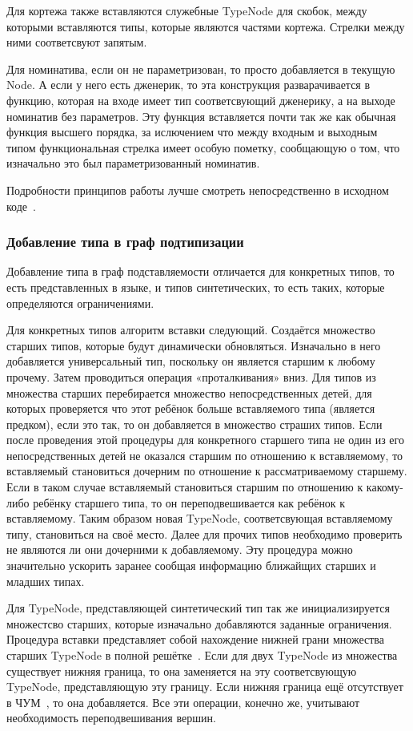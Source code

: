 \documentclass[times]{itmo-student-thesis}
\begin{document}
	Для кортежа также вставляются служебные TypeNode для скобок, между которыми вставляются типы, которые являются частями кортежа. Стрелки между ними соответсвуют запятым.
	
	Для номинатива, если он не параметризован, то просто добавляется в текущую Node. А если у него есть дженерик, то эта конструкция разварачивается в функцию, которая на входе имеет тип соответсвующий дженерику, а на выходе номинатив без параметров. Эту функция вставляется почти так же как обычная функция высшего порядка, за ислючением что между входным и выходным типом функциональная стрелка имеет особую пометку, сообщающую о том, что изначально это был параметризованный номинатив. 
	
	Подробности принципов работы лучше смотреть непосредственно в исходном коде~\cite{sourcecode}.
	
	\subsubsection{Добавление типа в граф подтипизации}
	Добавление типа в граф подставляемости отличается для конкретных типов, то есть представленных в языке, и типов синтетических, то есть таких, которые определяются ограничениями.
	
	Для конкретных типов алгоритм вставки следующий. Создаётся множество старших типов, которые будут динамически обновляться. Изначально в него добавляется универсальный тип, поскольку он является старшим к любому прочему. Затем проводиться операция «проталкивания» вниз. Для типов из множества старших перебирается множество непосредственных детей, для которых проверяется что этот ребёнок больше вставляемого типа (является предком), если это так, то он добавляется в множество страших типов. Если после проведения этой процедуры для конкретного старшего типа не один из его непосредственных детей не оказался старшим по отношению к вставляемому, то вставляемый становиться дочерним по отношение к рассматриваемому старшему. Если в таком случае вставляемый становиться старшим по отношению к какому-либо ребёнку старшего типа, то он переподвешивается как ребёнок к вставляемому. Таким образом новая TypeNode, соответсвующая вставляемому типу, становиться на своё место. Далее для прочих типов необходимо проверить не являются ли они дочерними к добавляемому. Эту процедура можно значительно ускорить заранее сообщая информацию ближайщих старших и младших типах.
	
	Для TypeNode, представляющей синтетический тип так же инициализируется множестсво старших, которые изначально добавляются заданные ограничения. Процедура вставки представляет собой нахождение нижней грани множества старших TypeNode в полной решётке~\cite{completelattice}. Если для двух TypeNode из множества существует нижняя граница, то она заменяется на эту соответсвующую TypeNode, представляющую эту границу. Если нижняя граница ещё отсутствует в ЧУМ~\cite{poset}, то она добавляется. Все эти операции, конечно же, учитывают необходимость переподвешивания вершин.
	
\end{document}
